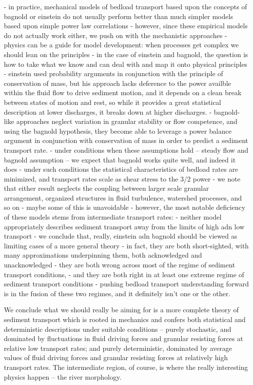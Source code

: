 \documentclass{article}
\begin{document}
{- in practice, mechanical models of bedload transport based upon the concepts of bagnold or einstein do not usually perform better than much simpler models based upon simple power law correlations
- however, since these empirical models do not actually work either, we push on with the mechanistic approaches
- physics can be a guide for model development: when processes get complex we should lean on the principles
- in the case of einstein and bagnold, the question is how to take what we know and can deal with and map it onto physical principles
- einstein used probability arguments in conjunction with the principle of conservation of mass, but his approach lacks deference to the power availble within the fluid flow to drive sediment motion, and it depends on a clean break between states of motion and rest, so while it provides a great statistical description at lower discharges, it breaks down at higher discharges. 
- bagnold-like approaches neglect variation in granular stability or flow competence, and using the bagnold hypothesis, they become able to leverage a power balance argument in conjunction with conservation of mass in order to predict a sediment transport rate. 
- under conditions when these assumptions hold -- steady flow and bagnold assumption -- we expect that bagnold works quite well, and indeed it does
- under such conditions the statistical characteristics of bedload rates are minimized, and transport rates scale as shear stress to the 3/2 power
- we note that either result neglects the coupling between larger scale granular arrangement, organized structures in fluid turbulence, watershed processes, and so on
- maybe some of this is unavoidable 
- however, the most notable deficiency of these models stems from intermediate transport rates: 
- neither model appropriately describes sediment transport away from the limits of high adn low transport
- we conclude that, really, einstein adn bagnold should be viewed as limiting cases of a more general theory
- in fact, they are both short-sighted, with many approximations underpinning them, both acknowledged and unacknowledged
- they are both wrong across most of the regime of sediment transport conditions, 
- and they are both right in at least one extreme regime of sediment transport conditions
- pushing bedload transport understanding forward is in the fusion of these two regimes, and it definitely isn't one or the other. 


We conclude what we should really be aiming for is a more complete theory of sediment transport which is rooted in mechanics and confers both statistical and deterministic descriptions under suitable conditions -- purely stochastic, and dominated by fluctuations in fluid driving forces and granular resisting forces at relative low transport rates; and purely deterministic, dominated by average values of fluid driving forces and granular resisting forces at relatively high transport rates. 
The intermediate region, of course, is where the really interesting physics happen -- the river morphology. 

}
\end{document}

